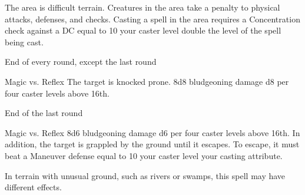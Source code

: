\begin{spellheader}
\end{spellheader}
\begin{spelleffects}
    \spelleffect The area is difficult terrain. Creatures in the area take a  penalty to physical attacks, defenses, and checks. Casting a spell in the area requires a Concentration check against a DC equal to 10 \add your caster level \add double the level of the spell being cast.
    \begin{spelltrigger}{End of every round, except the last round}
        \begin{spellattack}{Magic vs. Reflex}
            \spellsuccess The target is knocked prone.
            \spelleffect 8d8 bludgeoning damage \add d8 per four caster levels above 16th.
        \end{spellattack}
    \end{spelltrigger}
    \begin{spelltrigger}{End of the last round}
        \begin{spellattack}{Magic vs. Reflex}
            \spelleffect 8d6 bludgeoning damage \add d6 per four caster levels above 16th. In addition, the target is grappled by the ground until it escapes. To escape, it must beat a Maneuver defense equal to 10 \add your caster level \add your casting attribute.
        \end{spellattack}
    \end{spelltrigger}
\end{spelleffects}
\begin{spellfooter}
    \spellnotes In terrain with unusual ground, such as rivers or swamps, this spell may have different effects.
\end{spellfooter}

